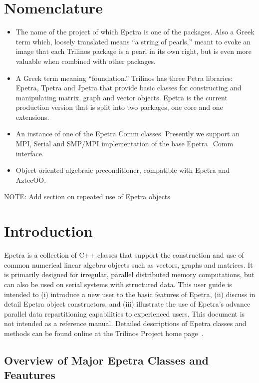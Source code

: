 \documentclass[12pt,relax]{EpetraUserGuide}
\newcommand{\comm}{Epetra\_Comm}
\begin{document}
\section*{Nomenclature}
\begin{itemize}
\item[Trilinos]
The name of the project of which Epetra is one of the packages.  Also a Greek term which,
loosely translated means ``a string of pearls,'' 
meant to evoke an image that each Trilinos package is a pearl in its 
own right, but is even more valuable when combined with other 
packages.
\item[Petra]
A Greek term meaning ``foundation.''  Trilinos has three Petra 
libraries: Epetra, Tpetra and Jpetra that provide basic classes 
for constructing and manipulating matrix, graph and vector
objects.  Epetra is the current production version that is
split into two packages, one core and one extensions.
\item[Comm Object]
An instance of one of the Epetra Comm classes.  Presently we support
an MPI, Serial and SMP/MPI implementation of the base \comm{} interface.
\item[Map Object] 
Object-oriented algebraic preconditioner, compatible with 
Epetra and AztecOO.
\end{itemize}

NOTE: Add section on repeated use of Epetra objects.


\section{Introduction}
\label{Section:Introduction}

Epetra is a collection of C++ classes that support the construction
and use of common numerical linear algebra objects such as vectors,
graphs and matrices.  It is primarily designed for irregular, parallel
distributed memory computations, but can also be used on serial systems
with structured data.  This user guide is intended to (i) introduce a new
user to the basic features of Epetra, (ii) discuss in detail Epetra
object constructors, and (iii) illustrate the use of
Epetra's advance parallel data repartitioning capabilities to
experienced users.  This document is not intended as a reference
manual.  Detailed descriptions of Epetra classes and methods can be
found online at the Trilinos Project home page~\cite{Trilinos-home-page}.


\subsection{Overview of Major Epetra Classes and Feautures}
\end{document}
